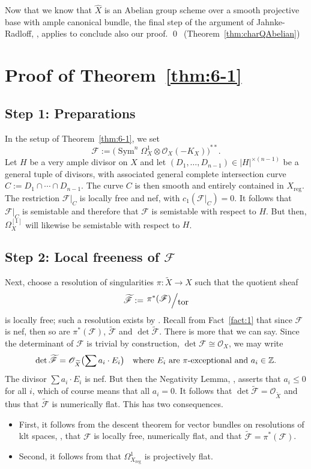 \documentclass[JEP,XML,SOM,Unicode,published]{cedram}
\let\scr\mathscr
\let\ts\relax
\theoremstyle{plain}
\theoremstyle{definition}
\numberwithin{equation}{thm}
\numberwithin{enumi}{thm}
\newcommand{\reg}{\mathrm{reg}}
\DeclareMathOperator{\Sym}{Sym}
\DeclareMathOperator{\tor}{tor}
\newcommand{\sF}{\scr{F}}
\newcommand{\sO}{\scr{O}}
\newcommand{\bZ}{\mathbb{Z}}
\let\wtilde\widetilde
\let\what\widehat
\newcommand{\factor}[2]{\left. \raise 2pt\hbox{$#1$} \right/\hskip -2pt\raise -2pt\hbox{$#2$}}
\begin{document}
Now that we know that $\what{X}$ is an Abelian group scheme over a smooth
projective base with ample canonical bundle, the final step of the argument of
Jahnke-Radloff, \cite[Th.\,6.1]{MR3030068}, applies to conclude also our proof.
\qed~\mbox{(Theorem~\ref{thm:charQAbelian})}

\section{Proof of Theorem~\ref*{thm:6-1}}

\subsection*{Step 1: Preparations}

In the setup of Theorem~\ref{thm:6-1}, we set
\[
\sF := \bigl(\Sym^n\Omega^1_X \otimes \sO_X(-K_X)\bigr)^{**}.
\]
Let $H$ be a very ample divisor on $X$ and let
$(D_1, \dots, D_{n-1}) \in |H|^{\times (n-1)}$ be a general tuple of divisors, with
associated general complete intersection curve $C := D_1 \cap\cdots\cap D_{n-1}$. The
curve $C$ is then smooth and entirely contained in $X_{\reg}$. The restriction
$\sF|_C$ is locally free and nef, with $c_1(\sF|_C) = 0$. It follows that $\sF|_C$ is
semistable and therefore that $\sF$ is semistable with respect to $H$. But then,
$\Omega^{[1]}_X$ will likewise be semistable with respect to $H$.

\subsection*{Step 2: Local freeness of $\sF$}

Next, choose a resolution of singularities $\pi: \wtilde{X} \to X$ such that the
quotient sheaf
\[
\wtilde{\sF} := \factor{\pi^*(\sF)}{\tor}
\]
is locally free; such a resolution exists by \cite[Th.\,3.5]{Rossi68}. Recall
from Fact~\ref{fact:1} that since $\sF$ is nef, then so are $\pi^*(\sF)$, $\wtilde{\sF}$
and $\det \wtilde{\sF}$. There is more that we can say. Since the determinant of
$\sF$ is trivial by construction, $\det \sF \cong \sO_X$, we may write
\[
\det \wtilde{\sF} = \sO_{\wtilde X}\bigl(\ts\sum a_i\cdot E_i\bigr) \quad \text{where
$E_i$ are $\pi$-exceptional and }a_i \in \bZ.
\]
The divisor $\sum a_i\cdot E_i$ is nef. But then the Negativity Lemma,
\cite[Lem.\,3.39(1)]{KM98}, asserts that $a_i \leq 0$ for all $i$, which of course
means that all $a_i = 0$. It follows that $\det \wtilde{\sF} = \sO_{\wtilde X}$ and
thus that $\wtilde{\sF}$ is numerically flat. This has two consequences.
\begin{itemize}
\item First, it follows from the descent theorem for vector bundles on
resolutions of klt spaces, \cite[Th.\,1.2]{GKPT17}, that $\sF$ is locally free,
numerically flat, and that $\wtilde{\sF} = \pi^*(\sF)$.

\item Second, it follows from \cite[Prop.\,3.7]{GKP20a} that $\Omega^1_{X_{\reg}}$ is
projectively flat.
\end{itemize}
\end{document}
